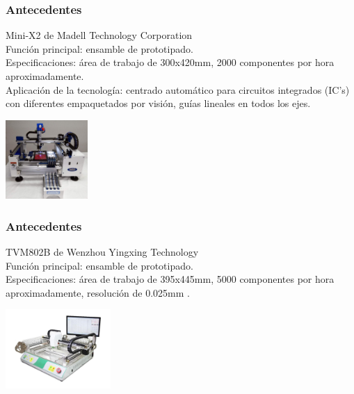 	\begin{frame}
		\frametitle{Antecedentes}
		Mini-X2 de Madell Technology Corporation\\
		Funci\'on principal: ensamble de prototipado.\\
		Especificaciones: \'area de trabajo de 300x420mm, 2000 componentes por hora aproximadamente.\\
		Aplicaci\'on de la tecnolog\'ia: centrado autom\'atico para circuitos integrados (IC's) con diferentes empaquetados por visi\'on, gu\'ias lineales en todos los  ejes.\\
		\begin{center}
			\includegraphics[height=30mm]{images/r2}
		\end{center}
	\end{frame}
	\begin{frame}
		\frametitle{Antecedentes}
		TVM802B de Wenzhou Yingxing Technology\\
		Funci\'on principal: ensamble de prototipado.\\
		Especificaciones: \'area de trabajo de 395x445mm, 5000 componentes por hora aproximadamente, resoluci\'on de  0.025mm .\\
		\begin{center}
			\includegraphics[height=30mm]{images/r3}
		\end{center}
	\end{frame}
